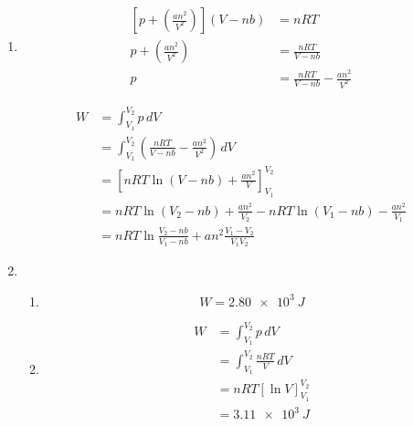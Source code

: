 \documentclass{article}
\begin{document}
\begin{enumerate}
  \item

        \begin{align*}
          \left[ p + \left( \frac{a n^2}{V^2} \right) \right] (V - n b) & = n R T                                     \\
          p + \left( \frac{a n^2}{V^2} \right)                          & = \frac{n R T}{V - n b}                     \\
          p                                                             & = \frac{n R T}{V - n b} - \frac{a n^2}{V^2}
        \end{align*}

        \begin{align*}
          W & = \int_{V_1}^{V_2} p \,d V                                                              \\
            & = \int_{V_1}^{V_2} \left( \frac{n R T}{V - n b} - \frac{a n^2}{V^2} \right) \,d V       \\
            & = \left[ n R T \ln (V - n b) + \frac{a n^2}{V} \right]_{V_1}^{V_2}                      \\
            & = n R T \ln (V_2 - n b) + \frac{a n^2}{V_2} - n R T \ln (V_1 - n b) - \frac{a n^2}{V_1} \\
            & = n R T \ln \frac{V_2 - n b}{V_1 - n b} + a n^2 \frac{V_1 - V_2}{V_1 V_2}
        \end{align*}

  \item

        \begin{enumerate}
          \item \[W = \qty{2.80e3}{J}\]

          \item

                \begin{align*}
                  W & = \int_{V_1}^{V_2} p \,d V               \\
                    & = \int_{V_1}^{V_2} \frac{n R T}{V} \,d V \\
                    & = n R T [\ln V]_{V_1}^{V_2}              \\
                    & = \qty{3.11e3}{J}
                \end{align*}
        \end{enumerate}
\end{enumerate}
\end{document}
